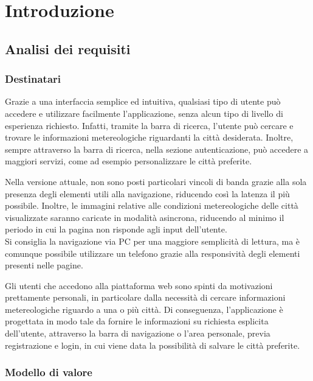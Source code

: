 \chapter{Introduzione}

\section{Analisi dei requisiti}

\subsection{Destinatari}

Grazie a una interfaccia semplice ed intuitiva, qualsiasi tipo di utente può accedere e utilizzare facilmente l'applicazione, senza alcun tipo di livello di esperienza richiesto.
Infatti, tramite la barra di ricerca, l'utente può cercare e trovare le informazioni metereologiche riguardanti la città desiderata.
Inoltre, sempre attraverso la barra di ricerca, nella sezione autenticazione, può accedere a maggiori servizi, come ad esempio personalizzare le città preferite.

\vspace{5mm}

Nella versione attuale, non sono posti particolari vincoli di banda grazie alla sola presenza degli elementi utili alla
navigazione, riducendo così la latenza il più possibile. Inoltre, le immagini relative alle condizioni metereologiche delle città
visualizzate saranno caricate in modalità asincrona, riducendo al minimo il periodo in cui la pagina non risponde agli input
dell'utente.\\
Si consiglia la navigazione via PC per una maggiore semplicità di lettura, ma è comunque possibile utilizzare un
telefono grazie alla responsività degli elementi presenti nelle pagine.

\vspace{5mm}

Gli utenti che accedono alla piattaforma web sono spinti da motivazioni prettamente personali, in particolare dalla necessità di cercare informazioni metereologiche riguardo a una o più città.
Di conseguenza, l'applicazione è progettata in modo tale da fornire le informazioni su richiesta esplicita dell'utente, attraverso la barra di navigazione o l'area personale, previa registrazione e login, in cui viene data la
possibilità di salvare le città preferite.

\subsection{Modello di valore}

